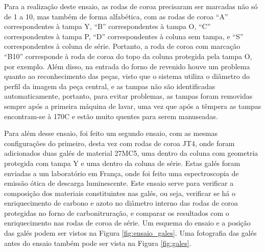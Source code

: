 \newpage
\par
Para a realização deste ensaio, as rodas de coroa precisaram ser marcadas não só de 1 a 10, mas também de forma alfabética, com as rodas de coroa “A” correspondentes à tampa Y, “B” correspondentes à tampa O, “C” correspondentes à tampa P, “D” correspondentes à coluna sem tampa, e “S” correspondentes à coluna de série. Portanto, a roda de coroa com marcação “B10” corresponde à roda de coroa do topo da coluna protegida pela tampa O, por exemplo. Além disso, na entrada do forno de revenido houve um problema quanto ao reconhecimento das peças, visto que o sistema utiliza o diâmetro do perfil da imagem da peça central, e as tampas não são identificadas automaticamente, portanto, para evitar problemas, as tampas foram removidas sempre após a primeira máquina de lavar, uma vez que após a têmpera as tampas encontram-se à 170\textdegree C e estão muito quentes para serem manuseadas.
\par
Para além desse ensaio, foi feito um segundo ensaio, com as mesmas configurações do primeiro, desta vez com rodas de coroa JT4, onde foram adicionados duas galés de material 27MC5, uma dentro da coluna com geometria protegida com tampa Y e uma dentro da coluna de série. Estas galés foram enviadas a um laboratório em França, onde foi feito uma espectroscopia de emissão ótica de descarga luminescente. Este ensaio serve para verificar a composição dos materiais constituintes nas galés, ou seja, verificar se há o enriquecimento de carbono e azoto no diâmetro interno das rodas de coroa protegidas no forno de carbonitruração, e comparar os resultados com o enriquecimento nas rodas de coroa de série. Um esquema do ensaio e a posição das galés podem ser vistos na Figura \ref{fig:ensaio_gales}. Uma fotografia das galés antes do ensaio também pode ser vista na Figura \ref{fig:gales}.
